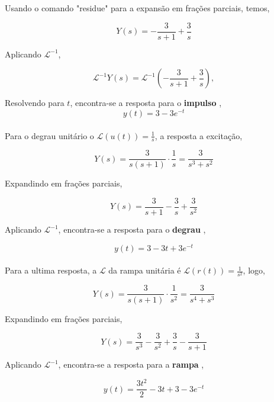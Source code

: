 \documentclass[a4paper, 10pt]{article}
\begin{document}
\begin{list}{\textbf{Questão .}}{
\setlength{\labelwidth}{-2mm} \setlength{\parsep}{0mm}
\setlength{\topsep}{0mm} \setlength{\leftmargin}{0mm}}
\begin{enumerate}
            Usando o comando "residue" para a expansão em frações parciais, temos,

            $$
                Y(s) = -\frac{3}{s+1} + \frac{3}{s}
            $$

            Aplicando $\mathcal{L}^{-1}$,

            $$
            \mathcal{L}^{-1}Y(s)=\mathcal{L}^{-1}( -\frac{3}{s+1} + \frac{3}{s} ),
            $$

            Resolvendo para $t$, encontra-se a resposta para o \textbf{impulso} ,
            \begin{equation}
                y(t) = 3 - 3 e^{-t}
            \end{equation}\\

            

            Para o degrau unitário o $\mathcal{L}(u(t)) = \frac{1}{s}$, a resposta a excitação,

            $$
            Y(s) = \frac{3}{s(s+1)} \cdot \frac{1}{s} = \frac{3}{s^3+s^2}
            $$

            Expandindo em frações parciais,

            $$
            Y(s) = \frac{3}{s+1} - \frac{3}{s} + \frac{3}{s^2} 
            $$

            Aplicando $\mathcal{L}^{-1}$, encontra-se a resposta para o \textbf{degrau} ,

            \begin{equation}
            y(t) = 3 - 3 t + 3 e^{-t}
            \end{equation}\\


            Para a ultima resposta, a $\mathcal{L}$ da rampa unitária é $\mathcal{L}(r(t)) = \frac{1}{s^2}$, logo,

            $$
            Y(s) = \frac{3}{s(s+1)} \cdot \frac{1}{s^2} = \frac{3}{s^4 + s^3}
            $$

            Expandindo em frações parciais,

            $$
            Y(s) = \frac{3}{s^3} - \frac{3}{s^2} + \frac{3}{s} - \frac{3}{s+1}
            $$

            Aplicando $\mathcal{L}^{-1}$, encontra-se a resposta para a \textbf{rampa} ,

           \begin{equation}
            y(t) = \frac{3 t^2}{2} - 3 t + 3 - 3 e^{-t}
        \end{equation}


\end{enumerate}
\end{list}
\end{document}
